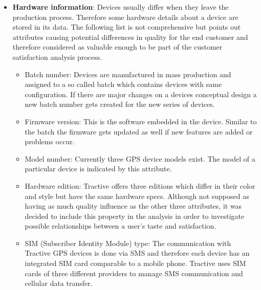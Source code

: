 \begin{itemize}
	\item \textbf{Hardware information}: Devices usually differ when they leave the production process. Therefore some hardware details about a device are stored in its data. The following list is not comprehensive but points out attributes causing potential differences in quality for the end customer and therefore considered as valuable enough to be part of the customer satisfaction analysis process.
	
	\begin{itemize}
		\item Batch number: Devices are manufactured in mass production and assigned to a so called batch which contains devices with same configuration. If there are major changes on a devices conceptual design a new batch number gets created for the new series of devices. 
		\item Firmware version: This is the software embedded in the device. Similar to the batch the firmware gets updated as well if new features are added or problems occur. 
		\item Model number: Currently three GPS device models exist. The model of a particular device is indicated by this attribute. 
		\item Hardware edition: Tractive offers three editions which differ in their color and style but have the same hardware specs. Although not supposed as having as much quality influence as the other three attributes, it was decided to include this property in the analysis in order to investigate possible relationships between a user's taste and satisfaction. 
		\item SIM (Subscriber Identity Module) type: The communication with Tractive GPS devices is done via SMS and therefore each device has an integrated SIM card comparable to a mobile phone. Tractive uses SIM cards of three different providers to manage SMS communication and cellular data transfer.
	\end{itemize}


\end{itemize}
